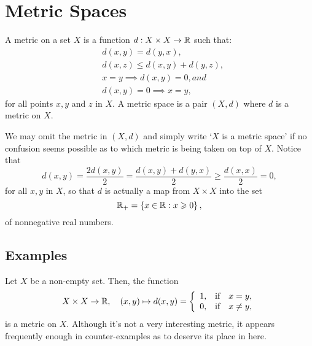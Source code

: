 \section{Metric Spaces}\label{sec:metric-spaces}

\begin{definition}
  A metric on a set \(X\) is a function \(d:X\times{X}\to\mathbb{R}\) such that:
  \begin{align}
      & d(x,y)=d(y,x),                  \label{axiom:metric-space-01} \\
      & d(x,z)\leqslant{d(x,y)+d(y,z)}, \label{axiom:metric-space-02} \\
      & x=y\implies{d(x,y)=0}, and      \label{axiom:metric-space-03} \\
      & d(x,y)=0\implies{x=y},          \label{axiom:metric-space-04}
  \end{align}
  for all points \(x,y\) and \(z\) in \(X\). A metric space is a pair \((X,d)\)
  where \(d\) is a metric on \(X\).
\end{definition}

We may omit the metric in \((X,d)\) and simply write `\(X\) is a metric space'
if no confusion seems possible as to which metric is being taken on top of
\(X\). Notice that
\[
  d(x,y)
  =
  \frac{2d(x,y)}{2}
  =
  \frac{d(x,y)+d(y,x)}{2}
  \geqslant
  \frac{d(x,x)}{2}
  =
  0,
\]
for all \(x,y\) in \(X\), so that \(d\) is actually a map from \(X\times{X}\)
into the set
\[
  \mathbb{R}_{+}
  =
  \left\{x\in\mathbb{R}:x\geqslant{0}\right\},
\]
of nonnegative real numbers.

\subsection{Examples}

\begin{example}\label{example:the-0-1-metric}
  Let \(X\) be a non-empty set. Then, the function
  \begin{equation*}
    X\times{X}\to\mathbb{R},\quad{(x,y)\mapsto{d(x,y)}}=
    \left\{
      \begin{array}{lll}
        1, & \text{if} & x=y, \\
        0, & \text{if} & x\neq{y},
      \end{array}
    \right.
  \end{equation*}
  is a metric on \(X\). Although it's not a very interesting metric, it appears
  frequently enough in counter-examples as to deserve its place in here.
\end{example}

